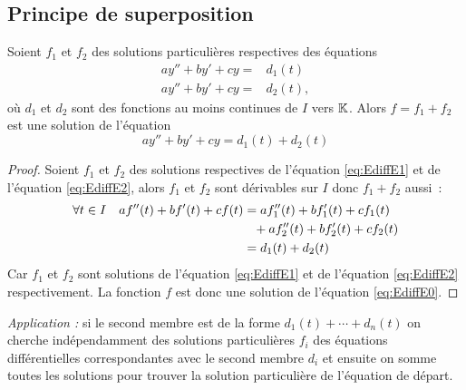 \subsection{Principe de superposition}
\begin{prop}
  Soient \(f_1\) et \(f_2\) des solutions particulières respectives des équations
  \begin{align}
    ay''+by'+cy=&d_1(t) \label{eq:EdiffE1}\\ 
    ay''+by'+cy=&d_2(t) \label{eq:EdiffE2},
  \end{align}
où \(d_1\) et \(d_2\) sont des fonctions au moins continues de \(I\) vers \(\mathbb{K}\). Alors \(f=f_1+f_2\) est une solution de l'équation
\begin{equation}
    \label{eq:EdiffE0}
  ay''+by'+cy=d_1(t)+d_2(t)
\end{equation}
\end{prop}
\begin{proof}
  Soient \(f_1\) et \(f_2\) des solutions respectives de l'équation \eqref{eq:EdiffE1} et de l'équation \eqref{eq:EdiffE2}, alors \(f_1\) et \(f_2\) sont dérivables sur \(I\) donc \(f_1+f_2\) aussi~:
  \begin{align}
    \forall t \in I \quad af''(t)+bf'(t)+cf(t)&=af_1''(t)+bf_1'(t)+cf_1(t) \notag \\ %
    &\phantom{=}+af_2''(t)+bf_2'(t)+cf_2(t)\\ &=d_1(t)+d_2(t)
  \end{align}
Car \(f_1\) et \(f_2\) sont solutions de l'équation \eqref{eq:EdiffE1} et de l'équation \eqref{eq:EdiffE2} respectivement. La fonction \(f\) est donc une solution de l'équation \eqref{eq:EdiffE0}.
\end{proof}
\emph{Application :} si le second membre est de la forme \(d_1(t)+ \dotsb +d_n(t)\) on cherche indépendamment des solutions particulières \(f_i\) des équations différentielles correspondantes avec le second membre \(d_i\) et ensuite on somme toutes les solutions pour trouver la solution particulière de l'équation de départ.

